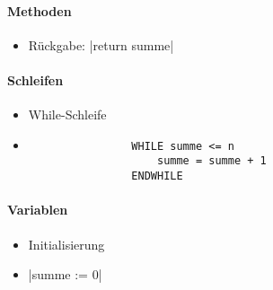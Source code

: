 \paragraph{Methoden}
     \begin{itemize}
	  	\item Rückgabe:
	  		|return summe| 
    \end{itemize}

\paragraph{Schleifen}
  	\begin{itemize}
		\item While-Schleife 
        \item[]
            \begin{verbatim}  
                WHILE summe <= n
                    summe = summe + 1
                ENDWHILE
            \end{verbatim}
      \end{itemize}
      
\paragraph{Variablen}
	\begin{itemize}
	 	\item Initialisierung
        \item[] |summe := 0| 
            
	
	\end{itemize}

  






